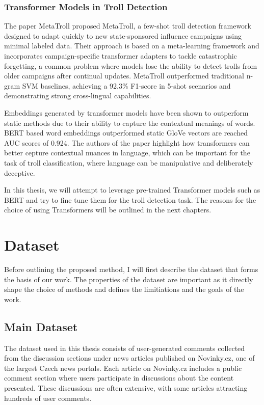 \documentclass[twoside]{ctuthesis}
\theoremstyle{plain}
\theoremstyle{definition}
\theoremstyle{note}
\begin{document}
\subsection{Transformer Models in Troll Detection}
The paper MetaTroll proposed MetaTroll, a few-shot troll detection framework designed to adapt quickly to new state-sponsored influence campaigns using minimal labeled data. Their approach is based on a meta-learning framework and incorporates campaign-specific transformer adapters to tackle catastrophic forgetting, a common problem where models lose the ability to detect trolls from older campaigns after continual updates. MetaTroll outperformed traditional n-gram SVM baselines, achieving a 92.3\% F1-score in 5-shot scenarios and demonstrating strong cross-lingual capabilities\cite{Tian2023}.\par
Embeddings generated by transformer models have been shown to outperform static methods due to their ability to capture the contextual meanings of words. BERT based word embeddings outperformed static GloVe vectors are reached AUC scores of 0.924. The authors of the paper \cite{yilmaz2023} highlight how transformers can better cepture contextual nuances in language, which can be important for the task of troll classification, where language can be manipulative and deliberately deceptive.

In this thesis, we will attempt to leverage pre-trained Transformer models such as BERT and try to fine tune them for the troll detection task. The reasons for the choice of using Transformers will be outlined in the next chapters.\par

\chapter{Dataset}

Before outlining the proposed method, I will first describe the dataset that forms the basis of our work. The properties of the dataset are important as it directly shape the choice of methods and defines the limitiations and the goals of the work. \par

\section{Main Dataset}
The dataset used in this thesis consists of user-generated comments collected from the discussion sections under news articles published on Novinky.cz, one of the largest Czech news portals. Each article on Novinky.cz includes a public comment section where users participate in discussions about the content presented. These discussions are often extensive, with some articles attracting hundreds of user comments.\par
\end{document}
